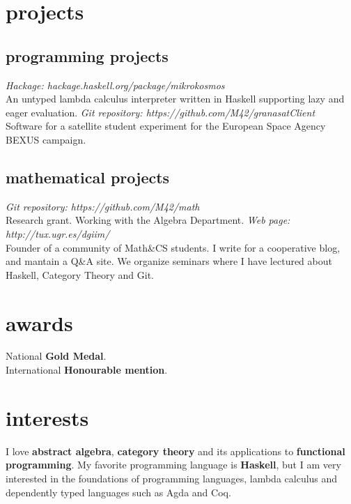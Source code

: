 \documentclass[print]{friggeri-cv-a4}
\begin{document}
\section{projects}
\subsection{programming projects}

\begin{entrylist}
{\emph{Hackage: hackage.haskell.org/package/mikrokosmos} \\
  An untyped lambda calculus interpreter written in Haskell
  supporting lazy and eager evaluation.
}
{\emph{Git repository: https://github.com/M42/granasatClient} \\
  Software for a satellite student experiment for the European Space Agency BEXUS
  campaign.
}
\end{entrylist}

\subsection{mathematical projects}

\begin{entrylist}
{\emph{Git repository: https://github.com/M42/math} \\
  Research grant. Working with the Algebra Department.}
{\emph{Web page: http://tux.ugr.es/dgiim/} \\
  Founder of a community of Math\&CS students. I write for a cooperative blog,
  and mantain a Q\&A site. We organize seminars where I have lectured about
  Haskell, Category Theory and Git.
}
\end{entrylist}


\section{awards}

\begin{entrylist}

{National \textbf{Gold Medal}. \\
International \textbf{Honourable mention}.}

\end{entrylist}

\section{interests}

I love \textbf{abstract algebra}, \textbf{category theory} and its applications to \textbf{functional
programming}. My favorite programming language is \textbf{Haskell}, but I am very interested in
the foundations of programming languages, lambda calculus and dependently typed languages such
as Agda and Coq.
\end{document}

